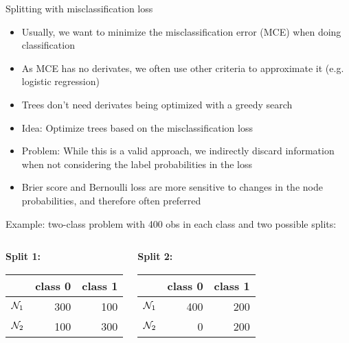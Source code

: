 \documentclass[11pt,compress,t,notes=noshow, xcolor=table]{beamer}
\begin{document}
\begin{vbframe}{Splitting with misclassification loss}

\begin{itemize}
\item Usually, we want to minimize the misclassification error (MCE) when doing classification
\item As MCE has no derivates, we often use other criteria to approximate it (e.g. logistic regression)
\item Trees don't need derivates being optimized with a greedy search
\item Idea: Optimize trees based on the misclassification loss
\item Problem: While this is a valid approach, we indirectly discard information when not considering the label probabilities in the loss
\item Brier score and Bernoulli loss are more sensitive to changes in the node probabilities, and therefore often preferred


\end{itemize}

\framebreak

Example: two-class problem with 400 obs in each class and two possible splits:
\begin{small}
\begin{columns}[T,onlytextwidth]
\begin{center}
\textbf{Split 1:} \\
\vspace{0.25cm}
\begin{table}[ht]
\centering
\begin{tabular}{rrr}
  \hline
 & class 0 & class 1 \\ 
  \hline
$\mathcal{N}_1$ & 300 & 100 \\ 
  $\mathcal{N}_2$ & 100 & 300 \\ 
   \hline
\end{tabular}
\end{table}

\end{center}
\begin{center}
\textbf{Split 2:} \\
\vspace{0.25cm}
\begin{table}[ht]
\centering
\begin{tabular}{rrr}
  \hline
 & class 0 & class 1 \\ 
  \hline
$\mathcal{N}_1$ & 400 & 200 \\ 
  $\mathcal{N}_2$ &   0 & 200 \\ 
   \hline
\end{tabular}
\end{table}


\end{center}
\end{columns}
\end{small}
\end{vbframe}
\end{document}
